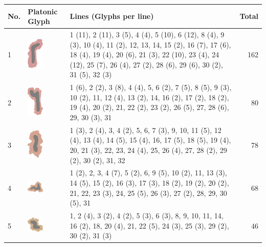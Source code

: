 \documentclass[final]{report}
\begin{document}

\begin{center}
\begin{longtable}{|p{0.5cm}|p{1.2cm}|p{11.89cm}|r|}
No. & Platonic Glyph & {Lines (Glyphs per line)} & {Total} \\
\hline
1 & \includegraphics[align=t,width=0.8cm]{0001} & 1 (11), 2 (11), 3 (5), 4 (4), 5 (10), 6 (12), 8 (4), 9 (3), 10 (4), 11 (2), 12, 13, 14, 15 (2), 16 (7), 17 (6), 18 (4), 19 (4), 20 (6), 21 (3), 22 (10), 23 (4), 24 (12), 25 (7), 26 (4), 27 (2), 28 (6), 29 (6), 30 (2), 31 (5), 32 (3) & 162 \\
\hline
2 & \includegraphics[align=t,width=0.8cm]{0002} & 1 (6), 2 (2), 3 (8), 4 (4), 5, 6 (2), 7 (5), 8 (5), 9 (3), 10 (2), 11, 12 (4), 13 (2), 14, 16 (2), 17 (2), 18 (2), 19 (4), 20 (2), 21, 22 (2), 23 (2), 26 (5), 27, 28 (6), 29, 30 (3), 31 & 80 \\
\hline
3 & \includegraphics[align=t,width=0.8cm]{0003} & 1 (3), 2 (4), 3, 4 (2), 5, 6, 7 (3), 9, 10, 11 (5), 12 (4), 13 (4), 14 (5), 15 (4), 16, 17 (5), 18 (5), 19 (4), 20, 21 (3), 22, 23, 24 (4), 25, 26 (4), 27, 28 (2), 29 (2), 30 (2), 31, 32 & 78 \\
\hline
4 & \includegraphics[align=t,width=0.8cm]{0004} & 1 (2), 2, 3, 4 (7), 5 (2), 6, 9 (5), 10 (2), 11, 13 (3), 14 (5), 15 (2), 16 (3), 17 (3), 18 (2), 19 (2), 20 (2), 21, 22, 23 (3), 24, 25 (5), 26 (3), 27 (2), 28, 29, 30 (5), 31 & 68 \\
\hline
5 & \includegraphics[align=t,width=0.8cm]{0005} & 1, 2 (4), 3 (2), 4 (2), 5 (3), 6 (3), 8, 9, 10, 11, 14, 16 (2), 18, 20 (4), 21, 22 (5), 24 (3), 25 (3), 29 (2), 30 (2), 31 (3) & 46 \\

\end{longtable}
\end{center}
\end{document}
